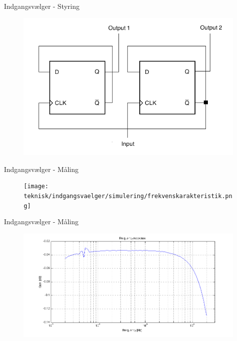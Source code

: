 \begin{frame}{Indgangsvælger - Styring}

\begin{figure}[h]
\centering
\includegraphics[scale=0.4]{../rapport/teknisk/indgangsvaelger/flipflop.png}
\label{fig:indgangsvaelger-flipflop}
\end{figure}
\end{frame}

\begin{frame}{Indgangsvælger - Måling}
\begin{figure}[h]
\centering
\texttt{[image: teknisk/indgangsvaelger/simulering/frekvenskarakteristik.png]}
\label{indgangsvaelger_frekvenskarakteristik}
\end{figure}
\end{frame}

\begin{frame}{Indgangsvælger - Måling}
\begin{figure}[h]
\centering
\includegraphics[width=\textwidth]{../rapport/maalerapporter/indgangsvaelger/Indgangsvlger-mic-200mv-frek.png}
\label{fig:indacc:frek200mv}
\end{figure}
\end{frame}

